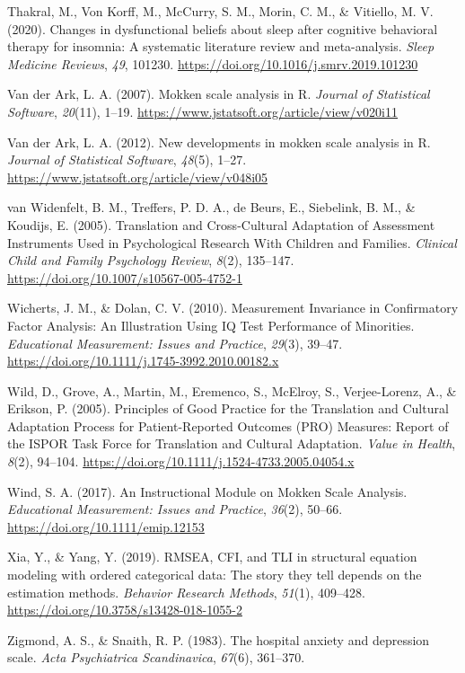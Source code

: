 \documentclass[
  ,doc,11pt, twoside,floatsintext]{apa6}
\newlength{\cslhangindent}
\newlength{\cslentryspacingunit} %
\newenvironment{CSLReferences}[2] %
 {%
  \setlength{\parindent}{0pt}
  \ifodd #1
  \let\oldpar\par
  \def\par{\hangindent=\cslhangindent\oldpar}
  \fi
  \setlength{\parskip}{#2\cslentryspacingunit}
 }%
 {}
\begin{document}
\begin{CSLReferences}{1}{0}
\leavevmode{}%
Thakral, M., Von Korff, M., McCurry, S. M., Morin, C. M., \& Vitiello, M. V. (2020). Changes in dysfunctional beliefs about sleep after cognitive behavioral therapy for insomnia: {A} systematic literature review and meta-analysis. \emph{Sleep Medicine Reviews}, \emph{49}, 101230. \url{https://doi.org/10.1016/j.smrv.2019.101230}

\leavevmode{}%
Van der Ark, L. A. (2007). Mokken scale analysis in {R}. \emph{Journal of Statistical Software}, \emph{20}(11), 1--19. \url{https://www.jstatsoft.org/article/view/v020i11}

\leavevmode{}%
Van der Ark, L. A. (2012). New developments in mokken scale analysis in {R}. \emph{Journal of Statistical Software}, \emph{48}(5), 1--27. \url{https://www.jstatsoft.org/article/view/v048i05}

\leavevmode{}%
van Widenfelt, B. M., Treffers, P. D. A., de Beurs, E., Siebelink, B. M., \& Koudijs, E. (2005). Translation and {Cross-Cultural Adaptation} of {Assessment Instruments Used} in {Psychological Research With Children} and {Families}. \emph{Clinical Child and Family Psychology Review}, \emph{8}(2), 135--147. \url{https://doi.org/10.1007/s10567-005-4752-1}

\leavevmode{}%
Wicherts, J. M., \& Dolan, C. V. (2010). Measurement {Invariance} in {Confirmatory Factor Analysis}: {An Illustration Using IQ Test Performance} of {Minorities}. \emph{Educational Measurement: Issues and Practice}, \emph{29}(3), 39--47. \url{https://doi.org/10.1111/j.1745-3992.2010.00182.x}

\leavevmode{}%
Wild, D., Grove, A., Martin, M., Eremenco, S., McElroy, S., Verjee-Lorenz, A., \& Erikson, P. (2005). Principles of {Good Practice} for the {Translation} and {Cultural Adaptation Process} for {Patient-Reported Outcomes} ({PRO}) {Measures}: {Report} of the {ISPOR Task Force} for {Translation} and {Cultural Adaptation}. \emph{Value in Health}, \emph{8}(2), 94--104. \url{https://doi.org/10.1111/j.1524-4733.2005.04054.x}

\leavevmode{}%
Wind, S. A. (2017). An {Instructional Module} on {Mokken Scale Analysis}. \emph{Educational Measurement: Issues and Practice}, \emph{36}(2), 50--66. \url{https://doi.org/10.1111/emip.12153}

\leavevmode{}%
Xia, Y., \& Yang, Y. (2019). {RMSEA}, {CFI}, and {TLI} in structural equation modeling with ordered categorical data: {The} story they tell depends on the estimation methods. \emph{Behavior Research Methods}, \emph{51}(1), 409--428. \url{https://doi.org/10.3758/s13428-018-1055-2}

\leavevmode{}%
Zigmond, A. S., \& Snaith, R. P. (1983). The hospital anxiety and depression scale. \emph{Acta Psychiatrica Scandinavica}, \emph{67}(6), 361--370.

\end{CSLReferences}
\end{document}
